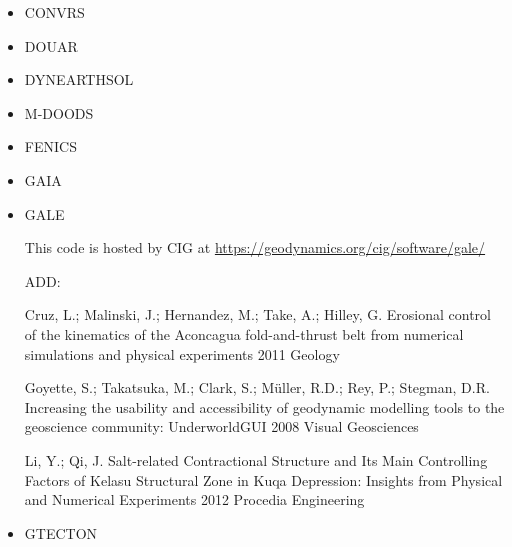 \begin{itemize}
\cite{kirh90}
\cite{itki94}
\cite{kian95}
\cite{kian98}
\cite{itki98}
\cite{befo99}
\cite{nake07}
\cite{dadh07}
\cite{kifr15}


\item CONVRS 
\cite{yoth12}
\cite{yosh13} 
 



\item DOUAR

\cite{brtf08}
\cite{thfb08}
\cite{yahb09}
\cite{brya10}
\cite{lobh10}
\cite{mutg13}
\cite{whbb14}
\cite{neew18}
\cite{koen19}

\item DYNEARTHSOL
\cite{chtl13}



\item M-DOODS
\cite{yatd12}
\cite{yahb13}

\item FENICS
\cite{alrk14}


\item GAIA

\cite{hutm13}

\item GALE

This code is hosted by CIG at \url{https://geodynamics.org/cig/software/gale/}

\cite{fabs08}
\cite{beve10}
\cite{cmwt10}
\cite{lehm12}
\cite{arbi13}

ADD:


Cruz, L.; Malinski, J.; Hernandez, M.; Take, A.; Hilley, G. 	Erosional control of the kinematics of the Aconcagua fold-and-thrust belt from numerical simulations and physical experiments 	2011 	Geology

	
Goyette, S.; Takatsuka, M.; Clark, S.; Müller, R.D.; Rey, P.; Stegman, D.R. 	Increasing the usability and accessibility of geodynamic modelling tools to the geoscience community: UnderworldGUI 	2008 	Visual Geosciences
	
Li, Y.; Qi, J. 	Salt-related Contractional Structure and Its Main Controlling Factors of Kelasu Structural Zone in Kuqa Depression: Insights from Physical and Numerical Experiments 	2012 	Procedia Engineering






\item GTECTON
\cite{gowo95}
\cite{gowo99}
\cite{bugw01}
\cite{bugw02}
\cite{gowo05}
\cite{degw06}
\cite{libi06}
\cite{bagw11}
\cite{bagw11b}
\cite{mags15}





\end{itemize}
